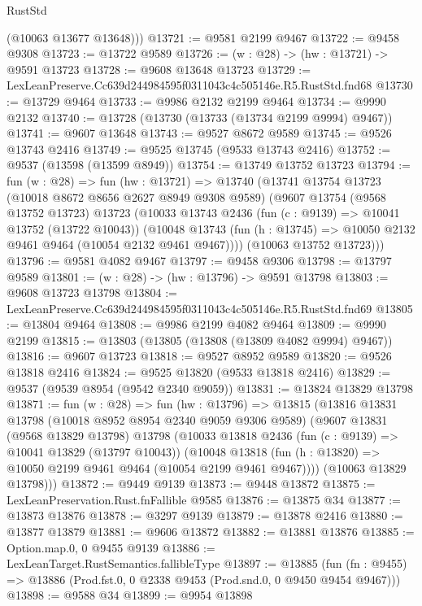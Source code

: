 \begin{lexlean}{RustStd}
\begin{coremodule}
        (@10063 @13677 @13648)))
@13721 := @9581 @2199 @9467
@13722 := @9458 @9308
@13723 := @13722 @9589
@13726 := (w : @28) -> (hw : @13721) -> @9591 @13723
@13728 := @9608 @13648 @13723
@13729 := LexLeanPreserve.Cc639d244984595f0311043c4c505146e.R5.RustStd.fnd68
@13730 := @13729 @9464
@13733 := @9986 @2132 @2199 @9464
@13734 := @9990 @2132
@13740 := @13728 (@13730 (@13733 (@13734 @2199 @9994) @9467))
@13741 := @9607 @13648
@13743 := @9527 @8672 @9589
@13745 := @9526 @13743 @2416
@13749 := @9525 @13745 (@9533 @13743 @2416)
@13752 := @9537 (@13598 (@13599 @8949))
@13754 := @13749 @13752 @13723
@13794 := fun (w : @28) =>
  fun (hw : @13721) =>
  @13740
    (@13741
      @13754
      @13723
      (@10018 @8672 @8656 @2627 @8949 @9308 @9589)
      (@9607
        @13754
        (@9568 @13752 @13723)
        @13723
        (@10033
          @13743
          @2436
          (fun (c : @9139) => @10041 @13752 (@13722 @10043))
          (@10048 @13743 (fun (h : @13745) => @10050 @2132 @9461 @9464 (@10054 @2132 @9461 @9467))))
        (@10063 @13752 @13723)))
@13796 := @9581 @4082 @9467
@13797 := @9458 @9306
@13798 := @13797 @9589
@13801 := (w : @28) -> (hw : @13796) -> @9591 @13798
@13803 := @9608 @13723 @13798
@13804 := LexLeanPreserve.Cc639d244984595f0311043c4c505146e.R5.RustStd.fnd69
@13805 := @13804 @9464
@13808 := @9986 @2199 @4082 @9464
@13809 := @9990 @2199
@13815 := @13803 (@13805 (@13808 (@13809 @4082 @9994) @9467))
@13816 := @9607 @13723
@13818 := @9527 @8952 @9589
@13820 := @9526 @13818 @2416
@13824 := @9525 @13820 (@9533 @13818 @2416)
@13829 := @9537 (@9539 @8954 (@9542 @2340 @9059))
@13831 := @13824 @13829 @13798
@13871 := fun (w : @28) =>
  fun (hw : @13796) =>
  @13815
    (@13816
      @13831
      @13798
      (@10018 @8952 @8954 @2340 @9059 @9306 @9589)
      (@9607
        @13831
        (@9568 @13829 @13798)
        @13798
        (@10033
          @13818
          @2436
          (fun (c : @9139) => @10041 @13829 (@13797 @10043))
          (@10048 @13818 (fun (h : @13820) => @10050 @2199 @9461 @9464 (@10054 @2199 @9461 @9467))))
        (@10063 @13829 @13798)))
@13872 := @9449 @9139
@13873 := @9448 @13872
@13875 := LexLeanPreservation.Rust.fnFallible @9585
@13876 := @13875 @34
@13877 := @13873 @13876
@13878 := @3297 @9139
@13879 := @13878 @2416
@13880 := @13877 @13879
@13881 := @9606 @13872
@13882 := @13881 @13876
@13885 := Option.map.{0, 0} @9455 @9139
@13886 := LexLeanTarget.RustSemantics.fallibleType
@13897 := @13885
    (fun (fn : @9455) => @13886 (Prod.fst.{0, 0} @2338 @9453 (Prod.snd.{0, 0} @9450 @9454 @9467)))
@13898 := @9588 @34
@13899 := @9954 @13898

\end{coremodule}
\end{lexlean}
